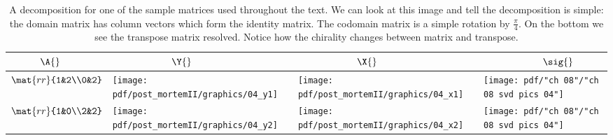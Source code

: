 \break
\clearpage
\begin{landscape}
\thispagestyle{empty}
\begin{table}[htdp]
\begin{center}
\begin{tabular}{m{0.75in}m{1.75in}m{1.75in}m{1.75in}}
  $ \quad \qquad \A{}$ & $\qquad \qquad \qquad \Y{}$ & $\qquad \qquad \qquad \X{}$ & $\qquad \qquad \qquad \sig{}$ \\ \hline\hline
  $\mat{rr}{1&2\\0&2}$ \qquad & \qquad 
  \texttt{[image: pdf/post\_mortemII/graphics/04\_y1]} \qquad & \qquad 
  \texttt{[image: pdf/post\_mortemII/graphics/04\_x1]} \qquad & \qquad 
  \texttt{[image: pdf/"ch 08"/"ch 08 svd pics 04"]} \\
  $\mat{rr}{1&0\\2&2}$ \qquad & \qquad 
  \texttt{[image: pdf/post\_mortemII/graphics/04\_y2]} \qquad & \qquad 
  \texttt{[image: pdf/post\_mortemII/graphics/04\_x2]} \qquad & \qquad 
  \texttt{[image: pdf/"ch 08"/"ch 08 svd pics 04"]} \\
\end{tabular}
\end{center}
\caption[A decomposition for one of the sample matrices]{A decomposition for one of the sample matrices used throughout the text. We can look at this image and tell the decomposition is simple: the domain matrix has column vectors which form the identity matrix. The codomain matrix is a simple rotation by $\frac{\pi}{4}$. On the bottom we see the transpose matrix resolved. Notice how the chirality changes between matrix and transpose.}
\label{tab:pmII:visualsd}
\end{table}%
\end{landscape}

